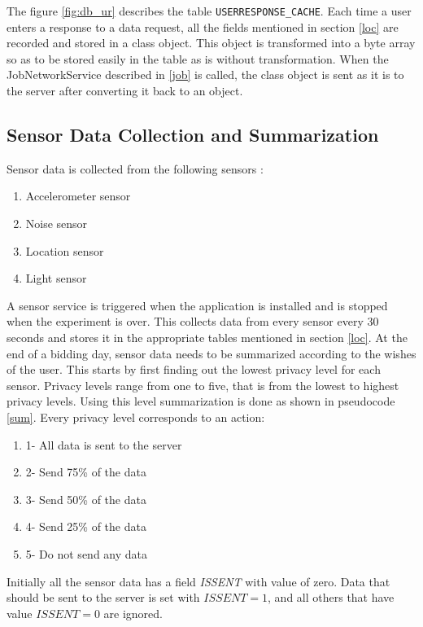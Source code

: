 The figure \ref{fig:db_ur} describes the table \texttt{USERRESPONSE\_CACHE}. Each time a user enters a response to a data request, all the fields mentioned in section
\ref{loc} are recorded and stored in a class object. This object is transformed into a byte array so as to be stored easily in the table as is without transformation.
When the JobNetworkService described in \ref{job} is called, the class object is sent as it is to the server after converting it back to an object.


\subsection{Sensor Data Collection and Summarization} 

Sensor data is collected from the following sensors :

\begin{enumerate}
	\item Accelerometer sensor
	\item Noise sensor
    \item Location sensor
    \item Light sensor
\end{enumerate}

A sensor service is triggered when the application is installed and is stopped when the experiment is over. This collects data from every sensor
every 30 seconds and stores it in the appropriate tables mentioned in section \ref{loc}.
At the end of a bidding day, sensor data needs to be summarized according to the wishes of the user. This starts by first finding out the lowest privacy level for each sensor. Privacy levels range from one to five, that is from the lowest to highest privacy levels. Using this level
summarization is done as shown in pseudocode \ref{sum}. Every privacy level corresponds to an action:

\begin{enumerate}
	\item 1- All data is sent to the server
	\item 2- Send 75\% of the data
    \item 3- Send 50\% of the data
    \item 4- Send 25\% of the data
    \item 5- Do not send any data
\end{enumerate}

Initially all the sensor data has a field \textit{ISSENT} with value of zero. Data that should be sent to the server is set with $\textit{ISSENT}=1$, and all others that have value $\textit{ISSENT}=0$ are ignored.

